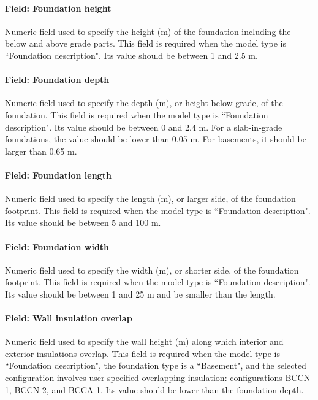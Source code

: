 \paragraph{Field: Foundation height}\label{field-foundationheight-basesimp}

Numeric field used to specify the height (m) of the foundation including the below and above grade parts.  This field is required when the model type is ``Foundation description".  Its value should be between 1 and 2.5 m.

\paragraph{Field: Foundation depth}\label{field-foundationdepth-basesimp}

Numeric field used to specify the depth (m), or height below grade, of the foundation.  This field is required when the model type is ``Foundation description".  Its value should be between 0 and 2.4 m.  For a slab-in-grade foundations, the value should be lower than 0.05 m.  For basements, it should be larger than 0.65 m.

\paragraph{Field: Foundation length}\label{field-foundationlength-basesimp}

Numeric field used to specify the length (m), or larger side, of the foundation footprint.  This field is required when the model type is ``Foundation description".  Its value should be between 5 and 100 m.

\paragraph{Field: Foundation width}\label{field-foundationwidth-basesimp}

Numeric field used to specify the width (m), or shorter side, of the foundation footprint.  This field is required when the model type is ``Foundation description".  Its value should be between 1 and 25 m and be smaller than the length.

\paragraph{Field: Wall insulation overlap}\label{field-insulationoverlap-basesimp}

Numeric field used to specify the wall height (m) along which interior and exterior insulations overlap.  This field is required when the model type is ``Foundation description", the foundation type is a ``Basement", and the selected configuration involves user specified overlapping insulation: configurations BCCN-1, BCCN-2, and BCCA-1.  Its value should be lower than the foundation depth.


